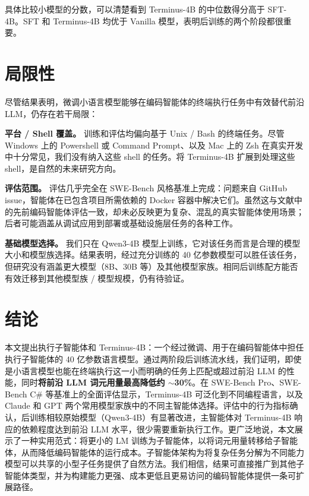 \documentclass[sigconf,review]{acmart}
\begin{document}
具体比较小模型的分数，可以清楚看到 Terminus-4B 的中位数得分高于 SFT-4B。SFT 和 Terminus-4B 均优于 Vanilla 模型，表明后训练的两个阶段都很重要。

\section{局限性}
尽管结果表明，微调小语言模型能够在编码智能体的终端执行任务中有效替代前沿 LLM，仍存在若干局限：

\textbf{平台 / Shell 覆盖。}
训练和评估均偏向基于 Unix / Bash 的终端任务。尽管 Windows 上的 Powershell 或 Command Prompt、以及 Mac 上的 Zsh 在真实开发中十分常见，我们没有纳入这些 shell 的任务。将 Terminus-4B 扩展到处理这些 shell，是自然的未来研究方向。

\textbf{评估范围。}
评估几乎完全在 SWE-Bench 风格基准上完成：问题来自 GitHub issue，智能体在已包含项目所需依赖的 Docker 容器中解决它们。虽然这与文献中的先前编码智能体评估一致，却未必反映更为复杂、混乱的真实智能体使用场景；后者可能涵盖从调试应用到部署或基础设施层任务的各种工作。

\textbf{基础模型选择。}
我们只在 Qwen3-4B 模型上训练，它对该任务而言是合理的模型大小和模型族选择。结果表明，经过充分训练的 40 亿参数模型可以胜任该任务，但研究没有涵盖更大模型（8B、30B 等）及其他模型家族。相同后训练配方能否有效迁移到其他模型族 / 模型规模，仍有待验证。

\section{结论}
本文提出执行子智能体和 Terminus-4B：一个经过微调、用于在编码智能体中担任执行子智能体的 40 亿参数语言模型。通过两阶段后训练流水线，我们证明，即使是小语言模型也能在终端执行这一小而明确的任务上匹配或超过前沿 LLM 的性能，同时\textbf{将前沿 LLM 词元用量最高降低约 $\sim$30\%}。在 SWE-Bench Pro、SWE-Bench C\# 等基准上的全面评估显示，Terminus-4B 可泛化到不同编程语言，以及 Claude 和 GPT 两个常用模型家族中的不同主智能体选择。评估中的行为指标确认，后训练相较原始模型（Qwen3-4B）有显著改进，主智能体对 Terminus-4B 响应的依赖程度达到前沿 LLM 水平，很少需要重新执行工作。更广泛地说，本文展示了一种实用范式：将更小的 LM 训练为子智能体，以将词元用量转移给子智能体，从而降低编码智能体的运行成本。子智能体架构为将复杂任务分解为不同能力模型可以共享的小型子任务提供了自然方法。我们相信，结果可直接推广到其他子智能体类型，并为构建能力更强、成本更低且更易访问的编码智能体提供一条可扩展路径。



\end{document}

